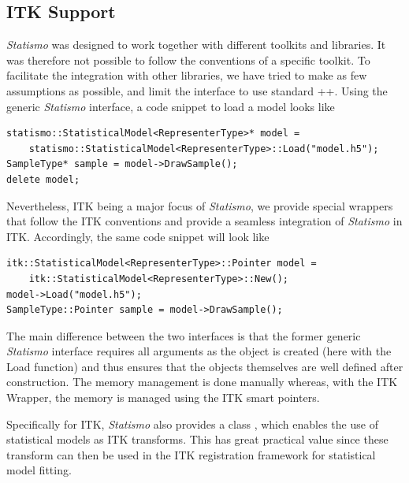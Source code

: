 \documentclass{InsightArticle}
\newcommand{\Statismo}{\emph{Statismo}\xspace}
\begin{document}
\subsection{ITK Support}
\Statismo was designed to work together with different toolkits
and libraries. It was therefore not possible to follow the conventions of a specific toolkit. 
To facilitate the integration with other libraries, we have tried to make as few assumptions as possible, and limit the
interface to use standard \C++. Using the generic \Statismo interface, a code snippet to
load a model looks like
\begin{verbatim}
statismo::StatisticalModel<RepresenterType>* model = 
    statismo::StatisticalModel<RepresenterType>::Load("model.h5");
SampleType* sample = model->DrawSample();
delete model;
\end{verbatim}
Nevertheless, ITK being a major focus of \Statismo, we
provide special wrappers that follow the ITK conventions and provide a seamless integration of  \Statismo in ITK. 
Accordingly, the same code snippet will look like
\begin{verbatim}
itk::StatisticalModel<RepresenterType>::Pointer model = 
    itk::StatisticalModel<RepresenterType>::New();
model->Load("model.h5");
SampleType::Pointer sample = model->DrawSample();
\end{verbatim}
The main difference between the two interfaces is that the former generic \Statismo interface
requires all arguments as the object is created
(here with the Load function) and thus ensures that 
the objects themselves are well defined after construction.
The memory management is done manually whereas, with the ITK Wrapper, the memory is managed using the ITK smart pointers. 

Specifically for ITK, \Statismo also provides a class , which 
enables the use of statistical models as ITK transforms. This has great practical value since these transform can then be used in the  ITK registration framework for statistical model fitting. 
\end{document}
